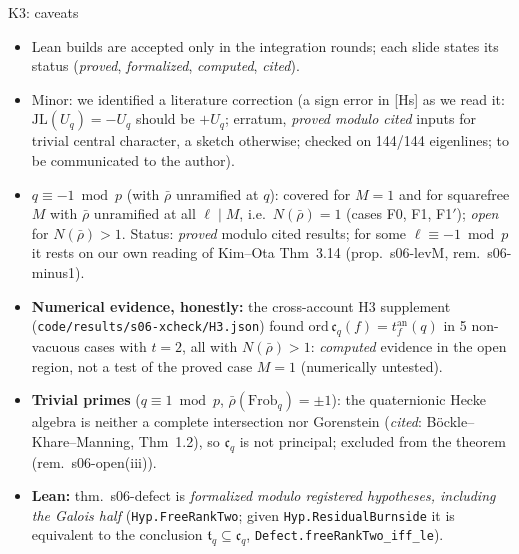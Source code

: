 \begin{frame}[shrink=8]{K3: caveats}
  \small
  \begin{itemize}
    \item Lean builds are accepted only in the integration rounds; each slide states its status (\emph{proved}, \emph{formalized}, \emph{computed}, \emph{cited}).
    \item Minor: we identified a literature correction (a sign error in [Hs] as we read it: $\mathrm{JL}(U_q)=-U_q$ should be $+U_q$; erratum, \emph{proved modulo cited} inputs for trivial central character, a sketch otherwise; checked on 144/144 eigenlines; to be communicated to the author).
    \item \textbf{$q\equiv-1\bmod p$} (with $\bar\rho$ unramified at $q$): covered for $M=1$ and for squarefree $M$ with $\bar\rho$ unramified at all $\ell\mid M$, i.e.\ $N(\bar\rho)=1$ (cases F0, F1, F1$'$); \emph{open} for $N(\bar\rho)>1$. Status: \emph{proved} modulo cited results; for some $\ell\equiv-1\bmod p$ it rests on our own reading of Kim--Ota Thm~3.14 (prop.\ s06-levM, rem.\ s06-minus1).
    \item \textbf{Numerical evidence, honestly:} the cross-account H3 supplement (\texttt{code/results/s06-xcheck/H3.json}) found $\mathrm{ord}\,\mathfrak c_q(f)=t^{\mathrm{an}}_f(q)$ in 5 non-vacuous cases with $t=2$, all with $N(\bar\rho)>1$: \emph{computed} evidence in the open region, not a test of the proved case $M=1$ (numerically untested).
    \item \textbf{Trivial primes} ($q\equiv1\bmod p$, $\bar\rho(\mathrm{Frob}_q)=\pm1$): the quaternionic Hecke algebra is neither a complete intersection nor Gorenstein (\emph{cited}: Böckle--Khare--Manning, Thm~1.2), so $\mathfrak c_q$ is not principal; excluded from the theorem (rem.\ s06-open(iii)).
    \item \textbf{Lean:} thm.\ s06-defect is \emph{formalized modulo registered hypotheses, including the Galois half} (\texttt{Hyp.FreeRankTwo}; given \texttt{Hyp.ResidualBurnside} it is equivalent to the conclusion $\mathfrak t_q\subseteq\mathfrak c_q$, \texttt{Defect.freeRankTwo\_iff\_le}).
  \end{itemize}
\end{frame}

